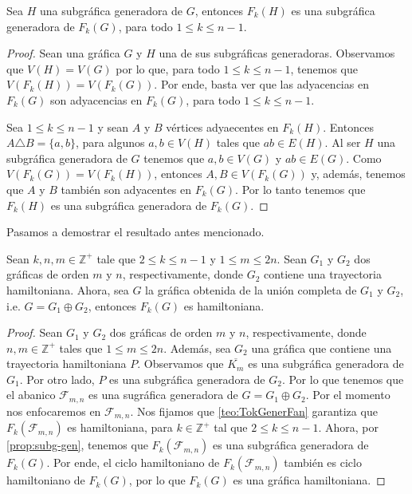 \begin{proposicion}
\label{prop:subg-gen}
    Sea $H$ una subgr\'afica generadora de $G$, entonces $F_k(H)$ es una
    subgr\'afica generadora de $F_k(G)$, para todo $1 \leq k \leq n-1$.
\end{proposicion}

\begin{proof}
    Sean una gr\'afica $G$ y $H$ una de sus subgr\'aficas generadoras.
    Observamos que $V(H)=V(G)$ por lo que, para todo $1 \leq k \leq n-1$,
    tenemos que $V(F_k(H))=V(F_k(G))$. Por ende, basta ver que las adyacencias
    en $F_k(G)$ son adyacencias en $F_k(G)$, para todo $1 \leq k \leq n-1$.

    Sea $1 \leq k \leq n-1$ y sean $A$ y $B$ v\'ertices adyaecentes en $F_k(H)$.
    Entonces $ A \triangle B = \{a,b\}$, para algunos $a,b \in V(H)$ tales que
    $ab \in E(H)$. Al ser $H$ una subgr\'afica generadora de $G$ tenemos que
    $a,b \in V(G)$ y $ab \in E(G)$. Como $V(F_k(G))=V(F_k(H))$, entonces $A,B
    \in V(F_k(G))$ y, adem\'as, tenemos que $A$ y $B$ tambi\'en son adyacentes
    en $F_k(G)$. Por lo tanto tenemos que $F_k(H)$ es una subgr\'afica
    generadora de $F_k(G)$.
\end{proof}

Pasamos a demostrar el resultado antes mencionado.

\begin{corolario}
    Sean $k,n,m \in \mathbb{Z^{+}}$ tale que $2 \leq k \leq n-1$ y $1 \leq m
    \leq 2n$. Sean $G_1$ y $G_2$ dos gr\'aficas de orden $m$ y $n$,
    respectivamente, donde $G_2$ contiene una trayectoria hamiltoniana. Ahora,
    sea $G$ la gr\'afica obtenida de la uni\'on completa de $G_1$ y $G_2$, i.e.
    $G = G_1 \oplus G_2$, entonces $F_k(G)$ es hamiltoniana. 
\end{corolario}

\begin{proof}
    Sean $G_1$ y $G_2$ dos gr\'aficas de orden $m$ y $n$, respectivamente, donde
    $n,m \in \mathbb{Z^{+}}$ tales que $1 \leq m \leq 2n$. Adem\'as, sea $G_2$
    una gr\'afica que contiene una trayectoria hamiltoniana $P$. Observamos que
    $\overline{K_m}$ es una subgr\'afica generadora de $G_1$. Por otro lado, $P$
    es una subgr\'afica generadora de $G_2$. Por lo que tenemos que el abanico
    $\mathcal{F}_{m,n}$ es una sugr\'afica generadora de $G= G_1 \oplus G_2$.
    Por el momento nos enfocaremos en $\mathcal{F}_{m,n}$. Nos fijamos que
    \cref{teo:TokGenerFan} garantiza que $F_k(\mathcal{F}_{m,n})$ es
    hamiltoniana, para $k \in \mathbb{Z^{+}}$ tal que $2 \leq k \leq n-1$.
    Ahora, por \cref{prop:subg-gen}, tenemos que $F_k(\mathcal{F}_{m,n})$ es una
    subgr\'afica generadora de $F_k(G)$. Por ende, el ciclo hamiltoniano de
    $F_k(\mathcal{F}_{m,n})$ tambi\'en es ciclo hamiltoniano de $F_k(G)$, por lo
    que $F_k(G)$ es una gr\'afica hamiltoniana.
\end{proof}

